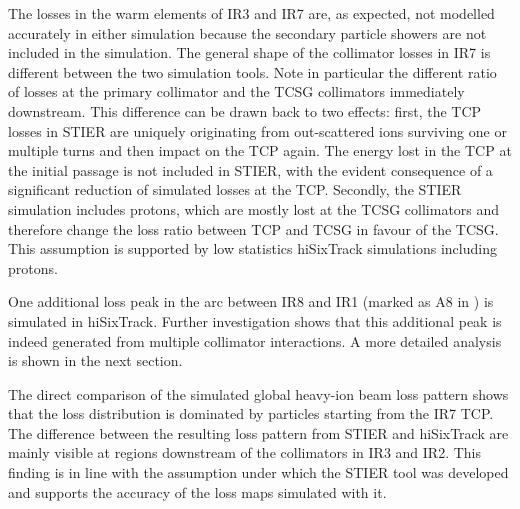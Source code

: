 The losses in the warm elements of IR3 and IR7 are, as expected, not modelled accurately in either simulation because the secondary particle showers are not included in the simulation. The general shape of the collimator losses in IR7 is different between the two simulation tools. Note in particular the different ratio of losses at the primary collimator and the TCSG collimators immediately downstream. This difference can be drawn back to two effects: first, the TCP losses in STIER are uniquely originating from out-scattered \lead ions surviving one or multiple turns and then impact on the TCP again. The energy lost in the TCP at the initial passage is not included in STIER, with the evident consequence of a significant reduction of simulated losses at the TCP. Secondly, the STIER simulation includes protons, which are mostly lost at the TCSG collimators and therefore change the loss ratio between TCP and TCSG in favour of the TCSG. This assumption is supported by low statistics hiSixTrack simulations including protons. 

One additional loss peak in the arc between IR8 and IR1 (marked as A8 in ) is simulated in hiSixTrack. Further investigation shows that this additional peak is indeed generated from multiple collimator interactions. A more detailed analysis is shown in the next section.


The direct comparison of the simulated global heavy-ion beam loss pattern shows that the loss distribution is dominated by particles starting from the IR7 TCP. The difference between the resulting loss pattern from STIER and hiSixTrack are mainly visible at regions downstream of the collimators in IR3 and IR2. This finding is in line with the assumption under which the STIER tool was developed and supports the accuracy of the loss maps simulated with it. 





